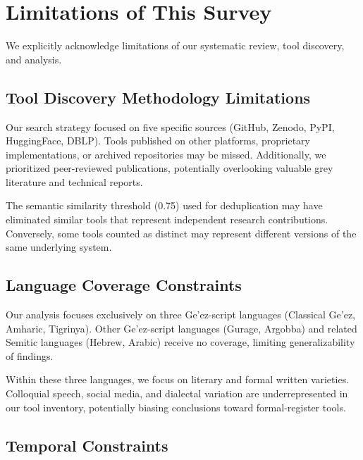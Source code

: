 \documentclass[12pt,a4paper]{article}
\theoremstyle{plain}
\theoremstyle{definition}
\begin{document}

\section{Limitations of This Survey}
\label{sec:limitations}

We explicitly acknowledge limitations of our systematic review, tool discovery, and analysis.

\subsection{Tool Discovery Methodology Limitations}

Our search strategy focused on five specific sources (GitHub, Zenodo, PyPI, HuggingFace, DBLP). Tools published on other platforms, proprietary implementations, or archived repositories may be missed. Additionally, we prioritized peer-reviewed publications, potentially overlooking valuable grey literature and technical reports.

The semantic similarity threshold (0.75) used for deduplication may have eliminated similar tools that represent independent research contributions. Conversely, some tools counted as distinct may represent different versions of the same underlying system.

\subsection{Language Coverage Constraints}

Our analysis focuses exclusively on three Ge'ez-script languages (Classical Ge'ez, Amharic, Tigrinya). Other Ge'ez-script languages (Gurage, Argobba) and related Semitic languages (Hebrew, Arabic) receive no coverage, limiting generalizability of findings.

Within these three languages, we focus on literary and formal written varieties. Colloquial speech, social media, and dialectal variation are underrepresented in our tool inventory, potentially biasing conclusions toward formal-register tools.

\subsection{Temporal Constraints}
\end{document}

